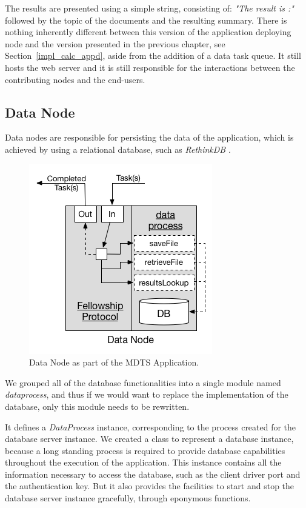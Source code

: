 \documentclass[12pt, titlepage]{uo_temp}
\begin{document}
     The results are presented using a simple string, consisting of: \emph{"The result
       is :"} followed by the topic of the documents and the resulting summary. 
     There is nothing inherently different between this version of the application
     deploying node and the version presented in the previous chapter, see
     Section~\ref{impl_calc_appd}, aside from the addition of a data task queue. It still
     hosts the web server and it is still responsible for the interactions between the
     contributing nodes and the end-users.

     \subsection{Data Node}
     Data nodes are responsible for persisting the data of the application, which is
     achieved by using a relational database, such as \emph{RethinkDB}
     \cite{rethinkdb}.
     
     \begin{figure}[h!]
       \centering
       \includegraphics{images/mdts_data.png}
       \caption{Data Node as part of the MDTS Application.}
     \end{figure}
    
     We grouped all of the database functionalities into a single module named
     \emph{dataprocess}, and thus if we would want to replace the implementation of the
     database, only this module needs to be rewritten.
     
     It defines a \emph{DataProcess} instance, corresponding to the process created for
     the database server instance. We created a class to represent a database instance,
     because a long standing process is required to provide database capabilities
     throughout the execution of the application. This instance contains all the
     information necessary to access the database, such as the client driver port and the
     authentication key. But it also provides the facilities to start and stop the database
     server instance gracefully, through eponymous functions.
\end{document}
